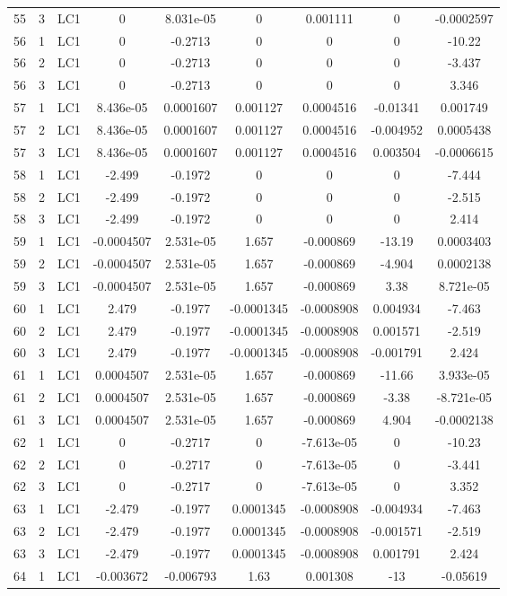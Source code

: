 \documentclass{article}%
\begin{document}
\begin{longtable}{| c c c | c c c c c c |}
55&3&LC1&0&8.031e{-}05&0&0.001111&0&{-}0.0002597\\%
56&1&LC1&0&{-}0.2713&0&0&0&{-}10.22\\%
56&2&LC1&0&{-}0.2713&0&0&0&{-}3.437\\%
56&3&LC1&0&{-}0.2713&0&0&0&3.346\\%
57&1&LC1&8.436e{-}05&0.0001607&0.001127&0.0004516&{-}0.01341&0.001749\\%
57&2&LC1&8.436e{-}05&0.0001607&0.001127&0.0004516&{-}0.004952&0.0005438\\%
57&3&LC1&8.436e{-}05&0.0001607&0.001127&0.0004516&0.003504&{-}0.0006615\\%
58&1&LC1&{-}2.499&{-}0.1972&0&0&0&{-}7.444\\%
58&2&LC1&{-}2.499&{-}0.1972&0&0&0&{-}2.515\\%
58&3&LC1&{-}2.499&{-}0.1972&0&0&0&2.414\\%
59&1&LC1&{-}0.0004507&2.531e{-}05&1.657&{-}0.000869&{-}13.19&0.0003403\\%
59&2&LC1&{-}0.0004507&2.531e{-}05&1.657&{-}0.000869&{-}4.904&0.0002138\\%
59&3&LC1&{-}0.0004507&2.531e{-}05&1.657&{-}0.000869&3.38&8.721e{-}05\\%
60&1&LC1&2.479&{-}0.1977&{-}0.0001345&{-}0.0008908&0.004934&{-}7.463\\%
60&2&LC1&2.479&{-}0.1977&{-}0.0001345&{-}0.0008908&0.001571&{-}2.519\\%
60&3&LC1&2.479&{-}0.1977&{-}0.0001345&{-}0.0008908&{-}0.001791&2.424\\%
61&1&LC1&0.0004507&2.531e{-}05&1.657&{-}0.000869&{-}11.66&3.933e{-}05\\%
61&2&LC1&0.0004507&2.531e{-}05&1.657&{-}0.000869&{-}3.38&{-}8.721e{-}05\\%
61&3&LC1&0.0004507&2.531e{-}05&1.657&{-}0.000869&4.904&{-}0.0002138\\%
62&1&LC1&0&{-}0.2717&0&{-}7.613e{-}05&0&{-}10.23\\%
62&2&LC1&0&{-}0.2717&0&{-}7.613e{-}05&0&{-}3.441\\%
62&3&LC1&0&{-}0.2717&0&{-}7.613e{-}05&0&3.352\\%
63&1&LC1&{-}2.479&{-}0.1977&0.0001345&{-}0.0008908&{-}0.004934&{-}7.463\\%
63&2&LC1&{-}2.479&{-}0.1977&0.0001345&{-}0.0008908&{-}0.001571&{-}2.519\\%
63&3&LC1&{-}2.479&{-}0.1977&0.0001345&{-}0.0008908&0.001791&2.424\\%
64&1&LC1&{-}0.003672&{-}0.006793&1.63&0.001308&{-}13&{-}0.05619\\%

\end{longtable}
\end{document}
